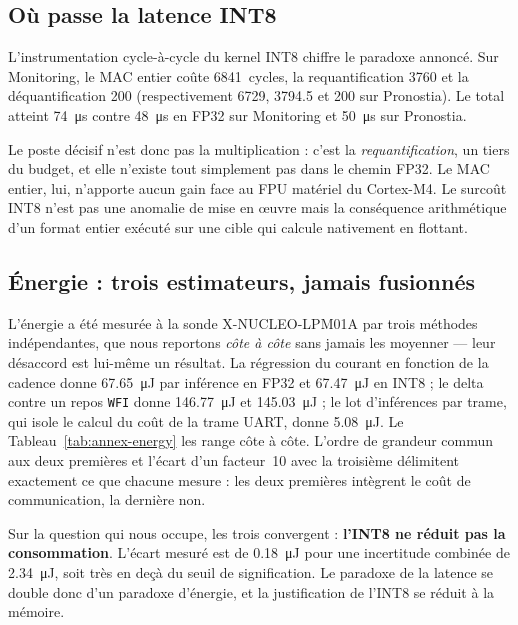 \subsection{Où passe la latence INT8}

L'instrumentation cycle-à-cycle du kernel INT8 chiffre le paradoxe annoncé. Sur Monitoring, le MAC entier
coûte \num{6841}~cycles, la requantification \num{3760} et la déquantification \num{200} (respectivement
\num{6729}, \num{3794.5} et \num{200} sur Pronostia). Le total atteint \SI{74}{\micro\second} contre
\SI{48}{\micro\second} en FP32 sur Monitoring et \SI{50}{\micro\second} sur Pronostia.

Le poste décisif n'est donc pas la multiplication : c'est la \emph{requantification}, un tiers du budget, et
elle n'existe tout simplement pas dans le chemin FP32. Le MAC entier, lui, n'apporte aucun gain face au FPU
matériel du Cortex-M4. Le surcoût INT8 n'est pas une anomalie de mise en \oe uvre mais la conséquence
arithmétique d'un format entier exécuté sur une cible qui calcule nativement en flottant.

\subsection{Énergie : trois estimateurs, jamais fusionnés}

L'énergie a été mesurée à la sonde X-NUCLEO-LPM01A par trois méthodes indépendantes, que nous reportons
\emph{côte à côte} sans jamais les moyenner --- leur désaccord est lui-même un résultat. La régression du
courant en fonction de la cadence donne \SI{67.65}{\micro\joule} par inférence en FP32 et
\SI{67.47}{\micro\joule} en INT8 ; le delta contre un repos \texttt{WFI} donne \SI{146.77}{\micro\joule} et
\SI{145.03}{\micro\joule} ; le lot d'inférences par trame, qui isole le calcul du coût de la trame UART,
donne \SI{5.08}{\micro\joule}. Le Tableau~\ref{tab:annex-energy} les range côte à côte.
L'ordre de grandeur commun aux deux premières et l'écart d'un facteur~10 avec
la troisième délimitent exactement ce que chacune mesure : les deux premières intègrent le coût de
communication, la dernière non.

Sur la question qui nous occupe, les trois convergent : \textbf{l'INT8 ne réduit pas la consommation}. L'écart
mesuré est de \SI{0.18}{\micro\joule} pour une incertitude combinée de \SI{2.34}{\micro\joule}, soit très en deçà du
seuil de signification. Le paradoxe de la latence se double donc d'un paradoxe d'énergie, et la
justification de l'INT8 se réduit à la mémoire.

